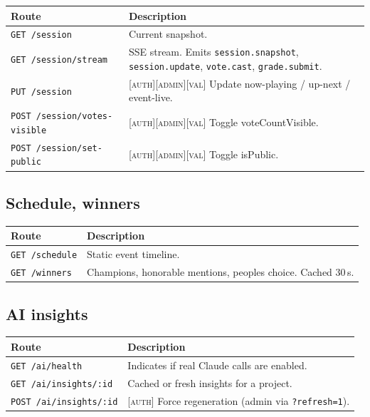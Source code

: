 \begin{longtable}{p{}p{}}
  \toprule
  \textbf{Route} & \textbf{Description} \\ \midrule
  \texttt{GET  /session}              & Current snapshot. \\
  \texttt{GET  /session/stream}       & SSE stream. Emits \texttt{session.snapshot}, \texttt{session.update}, \texttt{vote.cast}, \texttt{grade.submit}. \\
  \texttt{PUT  /session}              & [\textsc{auth}][\textsc{admin}][\textsc{val}] Update now-playing / up-next / event-live. \\
  \texttt{POST /session/votes-visible}& [\textsc{auth}][\textsc{admin}][\textsc{val}] Toggle voteCountVisible. \\
  \texttt{POST /session/set-public}   & [\textsc{auth}][\textsc{admin}][\textsc{val}] Toggle isPublic. \\
  \bottomrule
\end{longtable}

\subsection{Schedule, winners}

\begin{longtable}{p{}p{}}
  \toprule
  \textbf{Route} & \textbf{Description} \\ \midrule
  \texttt{GET /schedule} & Static event timeline. \\
  \texttt{GET /winners}  & Champions, honorable mentions, peoples choice. Cached 30\,s. \\
  \bottomrule
\end{longtable}

\subsection{AI insights}

\begin{longtable}{p{}p{}}
  \toprule
  \textbf{Route} & \textbf{Description} \\ \midrule
  \texttt{GET  /ai/health}            & Indicates if real Claude calls are enabled. \\
  \texttt{GET  /ai/insights/:id}      & Cached or fresh insights for a project. \\
  \texttt{POST /ai/insights/:id}      & [\textsc{auth}] Force regeneration (admin via \texttt{?refresh=1}). \\
  \bottomrule
\end{longtable}

